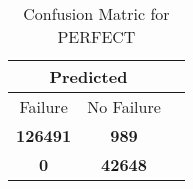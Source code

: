 \begin{table}[] 
\label{Table: Prediction Accuracy-DMDPERFECTOnlySunEKF-resetReflection-Reflection} 
\caption{Confusion Matric for PERFECT} 
\centering 
\begin{tabular} 
 {@{}ccc@{}} 
\toprule 
\multicolumn{2}{c}{\textbf{Predicted}}
 \\ \midrule 
\multicolumn{1}{|c|}{Failure} & 
\multicolumn{1}{c|}{No Failure}
 \\ \midrule 
\multicolumn{1}{|c|}{\color{green}\textbf{126491}} & 
\multicolumn{1}{c|}{\color{red}\textbf{989}}
 \\ \midrule 
\multicolumn{1}{|c|}{\color{red}\textbf{0}} & 
\multicolumn{1}{c|}{\color{green}\textbf{42648}}
 \\ \bottomrule 
\end{tabular} 
\end{table} 
